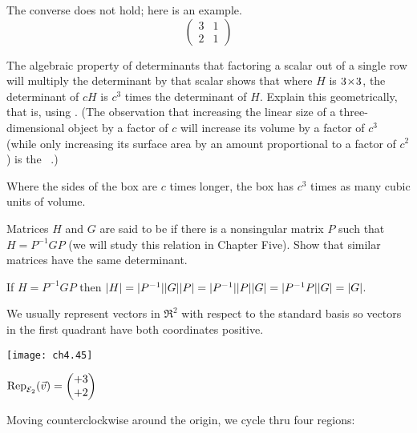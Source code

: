 \begin{exercises}
\begin{answer}
      The converse does not hold; here is an example.
      \begin{equation*}
        \begin{pmatrix}
          3  &1  \\
          2  &1
        \end{pmatrix}
      \end{equation*}
    \end{answer}
  \item 
    The algebraic 
    property of determinants that factoring a scalar out of a single
    row will multiply the determinant by that scalar shows that 
    where \( H \) is
    \( \nbyn{3} \), the determinant of \( cH \) is \( c^3 \) times the
    determinant of \( H \).
    Explain this geometrically, that is, 
    using .
    (The observation that increasing the linear size of a three-dimensional
    object by a factor of $c$ will increase its volume by a factor of 
    $c^3$ (while only increasing its surface area by an amount proportional 
    to a factor of 
    $c^2$) is the ~\cite{Wikipedia}.)
    \begin{answer}
      Where the sides of the box are \( c \) times longer, the box
      has \( c^3 \) times as many cubic units of volume.  
    \end{answer}
  \recommended \item 
    Matrices $H$ and $G$ are said to be 
    if there is a nonsingular matrix $P$ such that $H=P^{-1}GP$
    (we will study this relation in Chapter Five).
    Show that similar matrices have the same determinant.
    \begin{answer}
      If \( H=P^{-1}GP \)
      then \( \deter{H}=\deter{P^{-1}}\deter{G}\deter{P}
        =\deter{P^{-1}}\deter{P}\deter{G}=\deter{P^{-1}P}\deter{G}
        =\deter{G} \).  
    \end{answer}
  \item  \label{exer:BasisOrient}
    We usually represent vectors in \( \Re^2 \) with respect to the
    standard basis so vectors in the first quadrant have both coordinates
    positive.
    \begin{center}
      \parbox{.75in}{\hbox{}\hfil\texttt{[image: ch4.45]}\hfil\hbox{}}
      \qquad
      \( \rep{\vec{v}}{\stdbasis_2}=\colvec{+3 \\ +2} \)
    \end{center}
    Moving counterclockwise around the origin, we cycle thru four regions:

\end{exercises}
